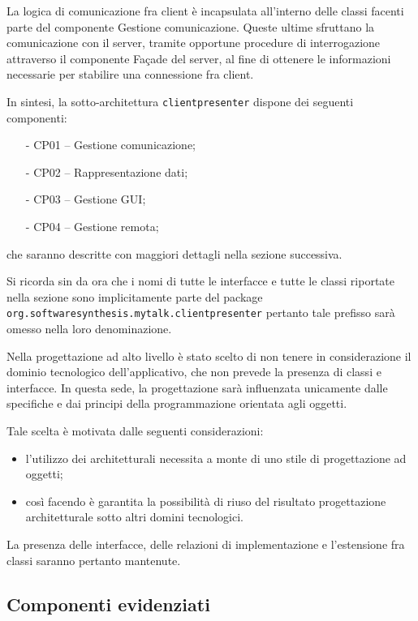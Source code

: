 La logica di comunicazione fra client è incapsulata all'interno delle classi facenti parte del componente \textsf{Gestione comunicazione}. Queste ultime sfruttano la comunicazione con il server, tramite opportune procedure di interrogazione attraverso il componente \textsf{Façade del server}, al fine di ottenere le informazioni necessarie per stabilire una connessione fra client.

In sintesi, la sotto-architettura \texttt{clientpresenter} dispone dei seguenti componenti:
\begin{itemize}[noitemsep,nolistsep]
	\item[-] \textsf{CP01 -- Gestione comunicazione};
	\item[-] \textsf{CP02 -- Rappresentazione dati};
	\item[-] \textsf{CP03 -- Gestione GUI};
	\item[-] \textsf{CP04 -- Gestione remota};
\end{itemize}
che saranno descritte con maggiori dettagli nella sezione successiva.

Si ricorda sin da ora che i nomi di tutte le interfacce e tutte le classi riportate nella sezione sono implicitamente parte del package \texttt{org.softwaresynthesis.mytalk.clientpresenter} pertanto tale prefisso sarà omesso nella loro denominazione.

Nella progettazione ad alto livello è stato scelto di non tenere in considerazione il dominio tecnologico dell'applicativo, che non prevede la presenza di classi e interfacce. In questa sede, la progettazione sarà influenzata unicamente dalle specifiche e dai principi della programmazione orientata agli oggetti.

Tale scelta è motivata dalle seguenti considerazioni:
\begin{itemize}
   \item l'utilizzo dei  architetturali necessita a monte di uno stile di progettazione ad oggetti;
   \item così facendo è garantita la possibilità di riuso del risultato progettazione architetturale sotto altri domini tecnologici.
\end{itemize}

La presenza delle interfacce, delle relazioni di implementazione e l'estensione fra classi saranno pertanto mantenute.

\subsection{Componenti evidenziati}

